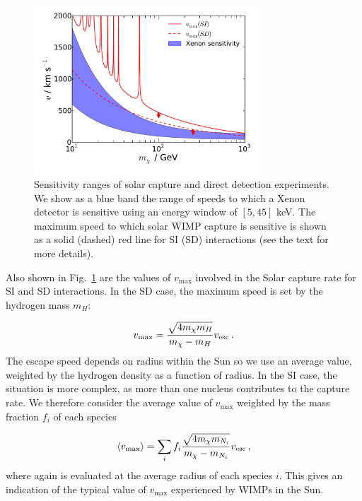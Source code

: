\begin{figure}[t]
  \centering
  \includegraphics[trim=0.8cm 0.9cm 0cm 0cm, clip,width=0.75\textwidth]{NT/SpeedOverlap.pdf}
  \caption[Speed sensitivity ranges of solar capture and direct detection experiments as a function of WIMP mass]{Sensitivity ranges of solar capture and direct detection experiments. We show as a blue band the range of speeds to which a Xenon detector is sensitive using an energy window of $[5,45]$ keV. The maximum speed to which solar WIMP capture is sensitive is shown as a solid (dashed) red line for SI (SD) interactions (see the text for more details).}
  \label{fig:NT:speedoverlap}
\end{figure}

Also shown in Fig.~\ref{fig:NT:speedoverlap} are the values of $v_\textrm{max}$ involved in the Solar capture rate for SI and SD interactions. In the SD case, the maximum speed is set by the hydrogen mass $m_H$:

\begin{equation}
v_{\textrm{max}} = \frac{\sqrt{4m_\chi m_H}}{m_\chi - m_H}\vesc\,.
\end{equation}
The escape speed \vesc depends on radius within the Sun so we use an average value, weighted by the hydrogen density as a function of radius. In the SI case, the situation is more complex, as more than one nucleus contributes to the capture rate. We therefore consider the average value of $v_\textrm{max}$ weighted by the mass fraction $f_i$ of each species

\begin{equation}
\langle v_{\textrm{max}} \rangle = \sum_i f_i \frac{\sqrt{4m_\chi m_{N_i}}}{m_\chi - m_{N_i}}\vesc\,,
\end{equation}
where again \vesc is evaluated at the average radius of each species $i$. This gives an indication of the typical value of $v_\textrm{max}$ experienced by WIMPs in the Sun.

